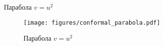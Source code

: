 \begin{frame}{Парабола \(v = u^2\)}
	\begin{figure}
		\centering
		\texttt{[image: figures/conformal\_parabola.pdf]}
		\caption{Парабола \(v=u^2\)}\label{fig:conformal_parabola}
	\end{figure}
\end{frame}
